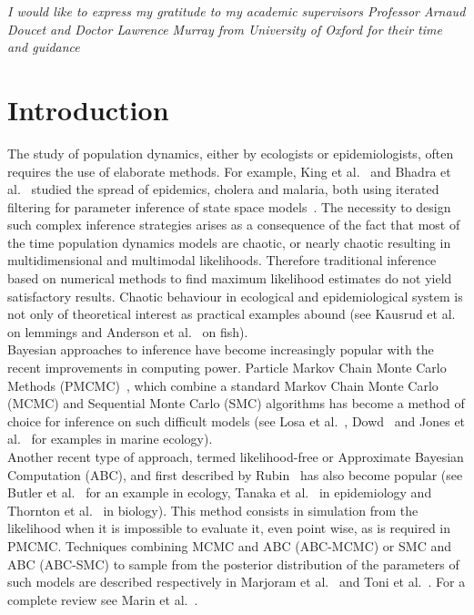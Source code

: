 \documentclass{article}
\begin{document}
	\newpage
	\vspace*{80mm}
		\textit{I would like to express my gratitude to my academic supervisors Professor Arnaud Doucet and Doctor Lawrence Murray from University of Oxford for their time and guidance}
	
	\newpage
	
	\listoffigures
	\clearpage
	\listoftables
	\clearpage
	\tableofcontents
	
	\clearpage
	\section{Introduction}
	The study of population dynamics, either by ecologists or epidemiologists, often requires the use of elaborate methods. For example, King et al.~\cite{king2008inapparent} and Bhadra et al.~\cite{bhadra2011malaria} studied the spread of epidemics, cholera and malaria, both using iterated filtering for parameter inference of state space models~\cite{ionides2006inference}. The necessity to design such complex inference strategies arises as a consequence of the fact that most of the time population dynamics models are chaotic, or nearly chaotic resulting in multidimensional and multimodal likelihoods. Therefore traditional inference based on numerical methods to find maximum likelihood estimates do not yield satisfactory results. Chaotic behaviour in ecological and epidemiological system is not only of theoretical interest as practical examples abound (see Kausrud et al.~\cite{kausrud2008linking} on lemmings and Anderson et al.~\cite{anderson2008fishing} on fish). \\
	
	Bayesian approaches to inference have become increasingly popular with the recent improvements in computing power. Particle Markov Chain Monte Carlo Methods (PMCMC)~\cite{andrieu2010particle}, which combine a standard Markov Chain Monte Carlo (MCMC) and Sequential Monte Carlo (SMC) algorithms has become a method of choice for inference on such difficult models (see Losa et al.~\cite{losa2003sequential}, Dowd~\cite{dowd2006sequential} and Jones et al.~\cite{jones2010bayesian} for examples in marine ecology). \\
	
	Another recent type of approach, termed likelihood-free or Approximate Bayesian Computation (ABC), and first described by Rubin~\cite{rubin1984bayesianly} has also become popular (see Butler et al.~\cite{butler57latent} for an example in ecology, Tanaka et al.~\cite{tanaka2006using} in epidemiology and Thornton et al.~\cite{thornton2006approximate} in biology). This method consists in simulation from the likelihood when it is impossible to evaluate it, even point wise, as is required in PMCMC. Techniques combining MCMC and ABC (ABC-MCMC) or SMC and ABC (ABC-SMC) to sample from the posterior distribution of the parameters of such models are described respectively in Marjoram et al.~\cite{marjoram2003markov} and Toni et al.~\cite{toni2009approximate}. For a complete review see Marin et al.~\cite{marin2012approximate}. \\
	
\end{document}
